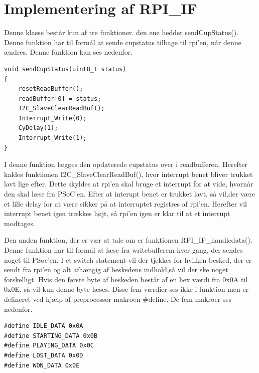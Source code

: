 \documentclass[Softwaredesign/Softwaredesign_main.tex]{subfiles}
\begin{document}
\section{Implementering af RPI\_IF}
Denne klasse består kun af tre funktioner. den ene hedder sendCupStatus(). Denne funktion har til formål at sende cupstatus tilbage til rpi'en, når denne ændres. Denne funktion kan ses nedenfor.
\begin{lstlisting}
void sendCupStatus(uint8_t status)
{
    resetReadBuffer();
    readBuffer[0] = status;
    I2C_SlaveClearReadBuf();
    Interrupt_Write(0);
    CyDelay(1);
    Interrupt_Write(1);
}
\end{lstlisting}
I denne funktion lægges den opdaterede cupstatus over i readbufferen. Herefter kaldes funktionen I2C\_SlaveClearReadBuf(), hvor interrupt benet bliver trukket lavt lige efter. Dette skyldes at rpi'en skal bruge et interrupt for at vide, hvornår den skal læse fra PSoC'en. Efter at interupt benet er trukket lavt, så vil,der være et lille delay for at være sikker på at interruptet registres af rpi'en. Herefter vil interrupt benet igen trækkes højt, så rpi'en igen er klar til at et interrupt modtages. 

Den anden funktion, der er vær at tale om er funktionen RPI\_IF\_handledata(). Denne funktion har til formål at læse fra writebufferem hver gang, der sendes noget til PSoc'en. I et switch statement vil der tjekkes for hvilken besked, der er sendt fra rpi'en og alt afhængig af beskedens indhold,så vil der ske noget forskelligt. Hvis den første byte af beskeden består af en hex værdi fra 0x0A til 0x0E, så vil kun denne byte læses. Disse fem værdier ses ikke i funktion men er defineret ved hjælp af preprocessor makroen #define. De fem makroer ses nedenfor.
\begin{lstlisting}
#define IDLE_DATA 0x0A
#define STARTING_DATA 0x0B
#define PLAYING_DATA 0x0C
#define LOST_DATA 0x0D
#define WON_DATA 0x0E
\end{lstlisting}
\end{document}
